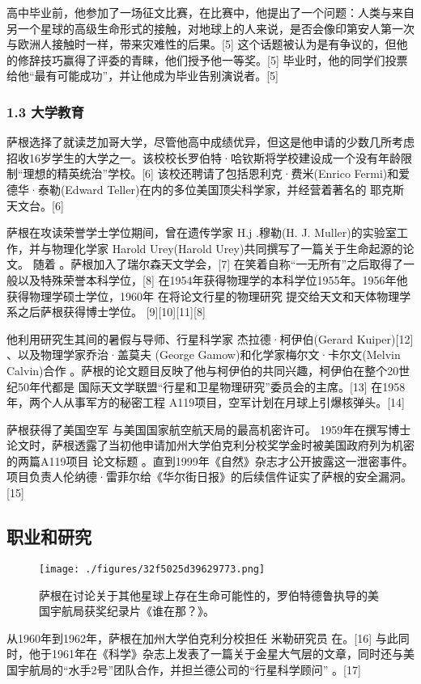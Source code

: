 高中毕业前，他参加了一场征文比赛，在比赛中，他提出了一个问题：人类与来自另一个星球的高级生命形式的接触，对地球上的人来说，是否会像印第安人第一次与欧洲人接触时一样，带来灾难性的后果。[5] 这个话题被认为是有争议的，但他的修辞技巧赢得了评委的青睐，他们授予他一等奖。[5] 毕业时，他的同学们投票给他“最有可能成功”，并让他成为毕业告别演说者。[5]
\subsubsection{1.3 大学教育}
萨根选择了就读芝加哥大学，尽管他高中成绩优异，但这是他申请的少数几所考虑招收16岁学生的大学之一。该校校长罗伯特·哈钦斯将学校建设成一个没有年龄限制“理想的精英统治”学校。[6] 该校还聘请了包括恩利克·费米(Enrico Fermi)和爱德华·泰勒(Edward Teller)在内的多位美国顶尖科学家，并经营着著名的 耶克斯天文台。[6]

萨根在攻读荣誉学士学位期间，曾在遗传学家 H.j .穆勒(H. J. Muller)的实验室工作，并与物理化学家 Harold Urey(Harold Urey)共同撰写了一篇关于生命起源的论文。 随着 。萨根加入了瑞尔森天文学会，[7] 在笑着自称“一无所有”之后取得了一般以及特殊荣誉本科学位，[8] 在1954年获得物理学的本科学位1955年。1956年他获得物理学硕士学位，1960年 在将论文行星的物理研究 提交给天文和天体物理学系之后萨根获得博士学位。 [9][10][11][8]

他利用研究生其间的暑假与导师、行星科学家 杰拉德·柯伊伯(Gerard Kuiper)[12] 、以及物理学家乔治·盖莫夫 (George Gamow)和化学家梅尔文·卡尔文(Melvin Calvin)合作 。萨根的论文题目反映了他与柯伊伯的共同兴趣，柯伊伯在整个20世纪50年代都是 国际天文学联盟“行星和卫星物理研究”委员会的主席。[13] 在1958年，两个人从事军方的秘密工程 A119项目，空军计划在月球上引爆核弹头。[14]

萨根获得了美国空军 与美国国家航空航天局的最高机密许可。 1959年在撰写博士论文时，萨根透露了当初他申请加州大学伯克利分校奖学金时被美国政府列为机密的两篇A119项目 论文标题 。直到1999年《自然》杂志才公开披露这一泄密事件。项目负责人伦纳德·雷菲尔给《华尔街日报》的后续信件证实了萨根的安全漏洞。[15]

\subsection{ 职业和研究}
\begin{figure}[ht]
\centering
\texttt{[image: ./figures/32f5025d39629773.png]}
\caption{萨根在讨论关于其他星球上存在生命可能性的，罗伯特德鲁执导的美国宇航局获奖纪录片《谁在那？》。} \label{fig_Sagan_2}
\end{figure}
从1960年到1962年，萨根在加州大学伯克利分校担任 米勒研究员 在。[16] 与此同时，他于1961年在《科学》杂志上发表了一篇关于金星大气层的文章，同时还与美国宇航局的“水手2号”团队合作，并担兰德公司的“行星科学顾问” 。[17]

